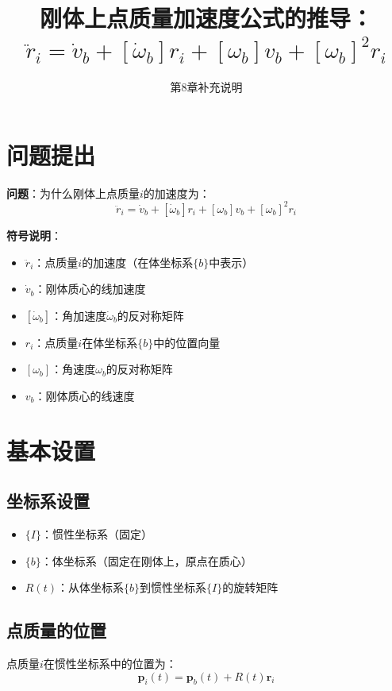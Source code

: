\documentclass[12pt,a4paper]{article}
\title{刚体上点质量加速度公式的推导：$\ddot{r}_i = \dot{v}_b + [\dot{\omega}_b] r_i + [\omega_b] v_b + [\omega_b]^2 r_i$}
\author{第8章补充说明}
\date{}
\begin{document}
\maketitle

\section{问题提出}

\textbf{问题}：为什么刚体上点质量$i$的加速度为：
\begin{equation}
\ddot{r}_i = \dot{v}_b + [\dot{\omega}_b] r_i + [\omega_b] v_b + [\omega_b]^2 r_i
\label{eq:acceleration}
\end{equation}

\textbf{符号说明}：
\begin{itemize}
\item $\ddot{r}_i$：点质量$i$的加速度（在体坐标系$\{b\}$中表示）
\item $\dot{v}_b$：刚体质心的线加速度
\item $[\dot{\omega}_b]$：角加速度$\dot{\omega}_b$的反对称矩阵
\item $r_i$：点质量$i$在体坐标系$\{b\}$中的位置向量
\item $[\omega_b]$：角速度$\omega_b$的反对称矩阵
\item $v_b$：刚体质心的线速度
\end{itemize}

\section{基本设置}

\subsection{坐标系设置}

\begin{itemize}
\item $\{I\}$：惯性坐标系（固定）
\item $\{b\}$：体坐标系（固定在刚体上，原点在质心）
\item $R(t)$：从体坐标系$\{b\}$到惯性坐标系$\{I\}$的旋转矩阵
\end{itemize}

\subsection{点质量的位置}

点质量$i$在惯性坐标系中的位置为：
\begin{equation}
\bm{p}_i(t) = \bm{p}_b(t) + R(t) \bm{r}_i
\label{eq:position}
\end{equation}
\end{document}
